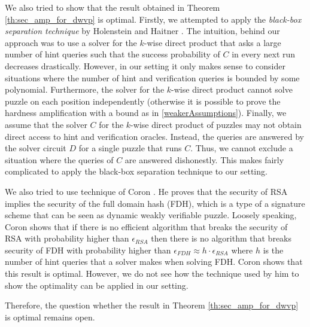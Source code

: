 We also tried to show that the result obtained in Theorem \ref{th:sec_amp_for_dwvp} is optimal.
Firstly, we attempted to apply the \textit{black-box separation technique} by Holenstein and Haitner \cite{haitner2009possibility}.
The intuition, behind our approach was to use a solver for the $k$-wise direct product that asks a large number of hint queries such that
the success probability of $C$ in every next run decreases drastically.
However, in our setting it only makes sense to consider situations where the number of hint and verification queries is bounded by some polynomial.
Furthermore, the solver for the $k$-wise direct product cannot solve puzzle on each position independently (otherwise it is possible
to prove the hardness amplification with a bound as in \ref{weakerAssumptions}).
Finally, we assume that the solver $C$ for the $k$-wise direct product of puzzles may not obtain direct access to hint and verification oracles.
Instead, the queries are answered by the solver circuit $D$ for a single puzzle that runs $C$. Thus, we cannot exclude a situation where the queries of $C$
are answered dishonestly.
This makes fairly complicated to apply the black-box separation technique to our setting.

We also tried to use technique of Coron \cite{coron2000exact, coron2002optimal}.
He proves that the security of RSA implies the security of the full domain hash (FDH),
which is a type of a signature scheme that can be seen as dynamic weakly verifiable puzzle.
Loosely speaking, Coron shows that if there is no efficient algorithm that breaks the security of RSA with probability higher
than $\epsilon_{\mathit{RSA}}$ then there is no algorithm that breaks security of FDH with probability higher than
$\epsilon_{\mathit{FDH}} \approx h \cdot \epsilon_{\mathit{RSA}}$ where $h$ is the number of hint queries that a solver makes when solving FDH.
Coron shows that this result is optimal. However, we do not see how the technique used by him to show the optimality can be applied in our setting.

Therefore, the question whether the result in Theorem \ref{th:sec_amp_for_dwvp} is optimal remains open.

